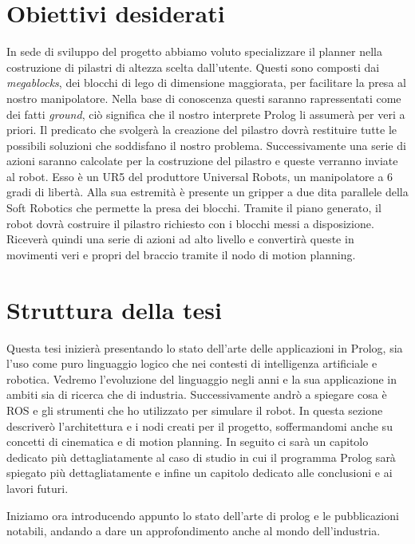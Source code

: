 \section{Obiettivi desiderati}
\label{sec:obiettdes}
In sede di sviluppo del progetto abbiamo voluto specializzare il planner nella costruzione di pilastri di altezza scelta dall'utente. Questi sono 
composti dai \textit{megablocks}, dei blocchi di lego di dimensione maggiorata, per facilitare la presa al nostro manipolatore. Nella base di conoscenza questi saranno rapressentati come dei fatti \textit{ground}, ciò significa che il nostro 
interprete Prolog li assumerà per veri a priori. Il predicato che svolgerà la creazione del pilastro dovrà restituire tutte le possibili soluzioni che
soddisfano il nostro problema. Successivamente una serie di azioni saranno calcolate per la costruzione del pilastro e queste verranno inviate al robot. Esso è un UR5
del produttore Universal Robots, un manipolatore a 6 gradi di libertà. Alla sua estremità è presente un gripper a due dita parallele della Soft Robotics che permette la presa dei blocchi.
Tramite il piano generato, il robot dovrà costruire il pilastro richiesto con i blocchi messi a disposizione. Riceverà quindi una serie di azioni ad alto
livello e convertirà queste in movimenti veri e propri del braccio tramite il nodo di motion planning.

\section{Struttura della tesi}
\label{sec:struttura}
Questa tesi inizierà presentando lo stato dell'arte delle applicazioni in Prolog, sia l'uso come puro linguaggio logico che nei contesti di
intelligenza artificiale e robotica. Vedremo l'evoluzione del linguaggio negli anni e la sua applicazione in ambiti sia di ricerca che di industria.
Successivamente andrò a spiegare cosa è ROS e gli strumenti che ho utilizzato per simulare il robot. In questa sezione descriverò
l'architettura e i nodi creati per il progetto, soffermandomi anche su concetti di cinematica e di motion planning.
In seguito ci sarà un capitolo dedicato più dettagliatamente al caso di studio in cui il programma Prolog sarà spiegato più
dettagliatamente e infine un capitolo dedicato alle conclusioni e ai lavori futuri.

Iniziamo ora introducendo appunto lo stato dell'arte di prolog e le pubblicazioni notabili, andando a dare un approfondimento anche al mondo dell'industria.

